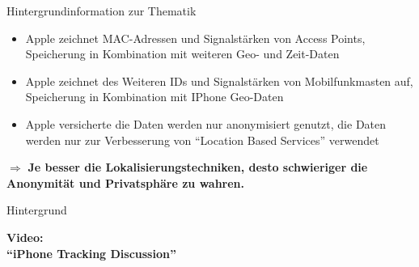\begin{frame}{Hintergrundinformation zur Thematik}
\begin{itemize}
  \item Apple zeichnet MAC-Adressen und Signalstärken von Access Points, Speicherung in Kombination mit weiteren Geo- und Zeit-Daten
  \item Apple zeichnet des Weiteren IDs und Signalstärken von Mobilfunkmasten auf, Speicherung in Kombination mit IPhone Geo-Daten
  \item Apple versicherte die Daten werden nur anonymisiert genutzt, die Daten werden nur zur Verbesserung von "`Location Based Services"' verwendet
\end{itemize}
$\Rightarrow$ \textbf{Je besser die Lokalisierungstechniken, desto schwieriger die Anonymität und Privatsphäre zu wahren.}
\end{frame}

\begin{frame}{Hintergrund}
\begin{center}
  \huge \textbf{Video:\\\vspace{1cm} "`iPhone Tracking Discussion"'}
\end{center}
\vspace{2cm}
\begin{center}
  \href{run:iphone.mp4}{}
\end{center}
\end{frame}


